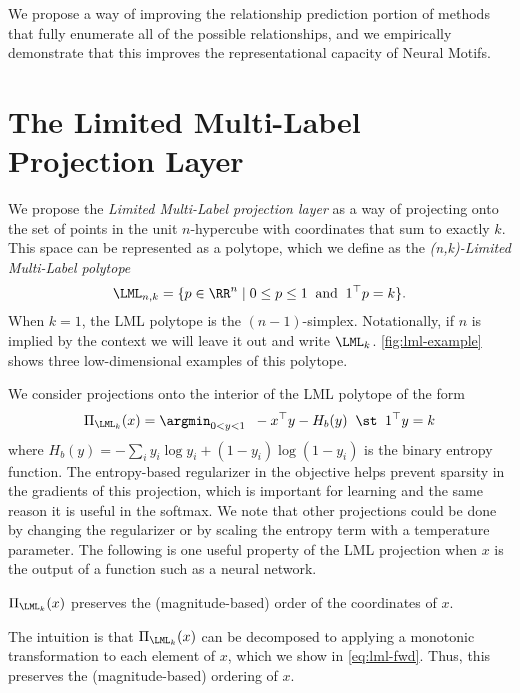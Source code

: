 We propose a way of improving the relationship prediction
portion of methods that fully enumerate all of the
possible relationships, and we empirically
demonstrate that this improves the
representational capacity of Neural Motifs.

\section{The Limited Multi-Label Projection Layer}
\label{sec:lml:lml}

We propose the \emph{Limited Multi-Label projection layer} as
a way of projecting onto the set of points in the unit
$n$-hypercube with coordinates that sum to exactly $k$.
This space can be represented as a polytope, which we define
as the \emph{(n,k)-Limited Multi-Label polytope}
$$\LML_{n,k} = \{p\in\RR^n \mid 0\leq p\leq 1 \;\;
  {\rm and} \;\; 1^\top p = k\}.$$
When $k=1$, the LML polytope is the $(n-1)$-simplex.
Notationally, if $n$ is implied by the context we will leave
it out and write $\LML_k$.
\cref{fig:lml-example} shows three low-dimensional examples
of this polytope.

We consider projections onto the interior of the LML polytope
of the form
\begin{equation}
  \Pi_{\LML_k}(x) = \argmin_{0<y<1} \;\; -x^\top y - H_b(y) \;\; \st\;\; 1^\top y = k
  \label{eq:lml-proj}
\end{equation}
where $H_b(y) = - \sum_i y_i\log y_i + (1-y_i)\log (1-y_i)$
is the binary entropy function.
The entropy-based regularizer in the objective helps prevent
sparsity in the gradients of this projection, which
is important for learning and the same reason it is useful
in the softmax.
We note that other projections could be done by changing the
regularizer or by scaling the entropy term with
a temperature parameter.
The following is one useful property of the LML projection
when $x$ is the output of a function such as a neural network.

\begin{proposition}\label{prop:order}
  $\Pi_{\LML_k}(x)$ preserves the (magnitude-based) order of
  the coordinates of $x$.
\end{proposition}
The intuition is that $\Pi_{\LML_k}(x)$ can be decomposed
to applying a monotonic transformation
to each element of $x$, which we show in \cref{eq:lml-fwd}.
Thus, this preserves the (magnitude-based) ordering of $x$.

